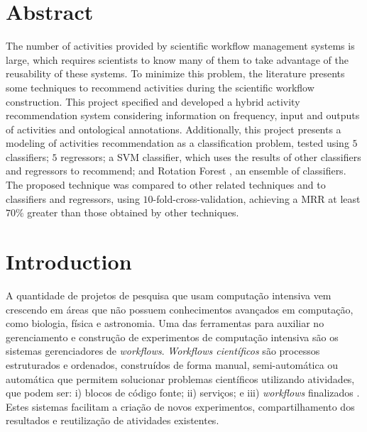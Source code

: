 \documentclass[10pt,letterpaper]{article}
\begin{document}
\section*{Abstract}
The number of activities provided by scientific workflow management systems is large,
which requires scientists to know many of them to take advantage of the reusability
of these systems. To minimize this problem, the literature presents some techniques to recommend activities during the scientific workflow construction. This project specified and developed a hybrid activity recommendation system considering information on frequency, input and outputs of activities and ontological annotations. Additionally, this project presents a modeling of activities recommendation as a classification problem, tested using \(5\) classifiers; \(5\) regressors; a SVM classifier, which uses the results of other classifiers and
regressors to recommend; and Rotation Forest , an ensemble of classifiers. The proposed technique was compared to other related techniques and to classifiers and regressors, using \(10\)-fold-cross-validation, achieving a MRR at least \(70\%\) greater than those obtained by other techniques.



\linenumbers

\section*{Introduction}
A quantidade de projetos de pesquisa que usam computação intensiva vem crescendo em áreas que não possuem conhecimentos avançados em computação, como biologia, f{\'i}sica e astronomia. Uma das ferramentas para auxiliar no gerenciamento e construção de experimentos de computação intensiva s{\~a}o os sistemas gerenciadores de \emph{workflows}. \emph{Workflows cient{\'i}ficos} s{\~a}o processos estruturados e ordenados, constru{\'i}dos de forma manual, semi-autom{\'a}tica ou autom{\'a}tica que permitem solucionar problemas cient{\'i}ficos utilizando atividades, que podem ser: i) blocos de c{\'o}digo fonte; ii) servi\c{c}os; e iii) \emph{workflows} finalizados \cite{Wang2010}. Estes sistemas facilitam a cria\c{c}{\~a}o de novos experimentos, compartilhamento dos resultados e reutiliza\c{c}{\~a}o de atividades existentes.
\end{document}
